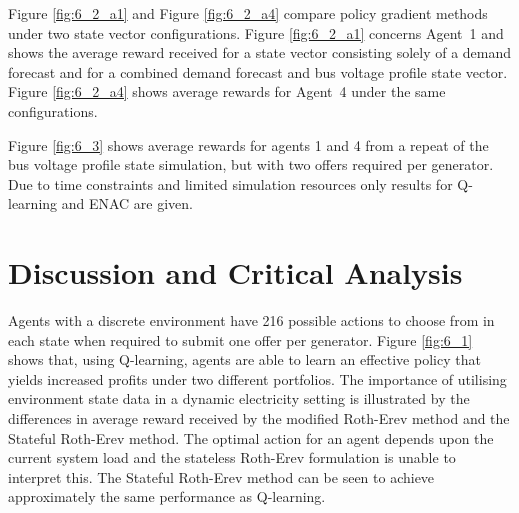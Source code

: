 Figure \ref{fig:6_2_a1} and Figure \ref{fig:6_2_a4} compare policy gradient
methods under two state vector configurations.  Figure \ref{fig:6_2_a1} concerns
Agent~1 and shows the average reward received for a state vector consisting
solely of a demand forecast and for a combined demand forecast and bus voltage
profile state vector.  Figure \ref{fig:6_2_a4} shows average rewards for
Agent~4 under the same configurations.


Figure \ref{fig:6_3} shows average rewards for agents 1 and 4 from a repeat of
the bus voltage profile state simulation, but with two offers required per
generator.  Due to time constraints and limited simulation resources only
results for Q-learning and ENAC are given.

\section{Discussion and Critical Analysis}
\label{sec:discuss}
Agents with a discrete environment have 216 possible actions to choose from in
each state when required to submit one offer per generator.  Figure
\ref{fig:6_1} shows that, using Q-learning, agents are able to learn an
effective policy that yields increased profits under two different portfolios.
The importance of utilising environment state data in a dynamic electricity
setting is illustrated by the differences in average reward received by the
modified Roth-Erev method and the Stateful Roth-Erev method.  The optimal action
for an agent depends upon the current system load and the stateless Roth-Erev
formulation is unable to interpret this.  The Stateful Roth-Erev method can be
seen to achieve approximately the same performance as Q-learning.

